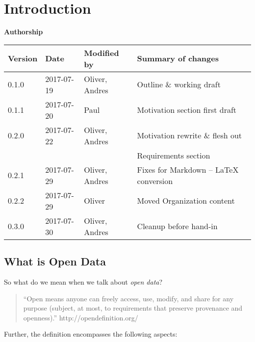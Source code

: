 \section{Introduction}\label{sec:introduction}

\textbf{Authorship}

\begin{longtable}{@{}llll@{}}
\toprule
Version & Date & Modified by & Summary of changes \\
\midrule
\endhead
0.1.0 & 2017-07-19 & Oliver, Andres & Outline \& working draft \\
0.1.1 & 2017-07-20 & Paul & Motivation section first draft \\
0.2.0 & 2017-07-22 & Oliver, Andres & Motivation rewrite \& flesh out \\
			&						 &								& Requirements section \\
0.2.1 & 2017-07-29 & Oliver, Andres & Fixes for Markdown -- LaTeX conversion \\
0.2.2 & 2017-07-29 & Oliver & Moved Organization content\\
0.3.0 & 2017-07-30 & Oliver, Andres & Cleanup before hand-in \\
\bottomrule
\end{longtable}

\subsection{What is Open Data}\label{what-is-open-data}

So what do we mean when we talk about \emph{open data}?

\begin{quotation}
``Open means anyone can freely access, use, modify, and share for any
purpose (subject, at most, to requirements that preserve provenance and
openness).'' http://opendefinition.org/
\end{quotation}

Further, the definition encompasses the following aspects:

